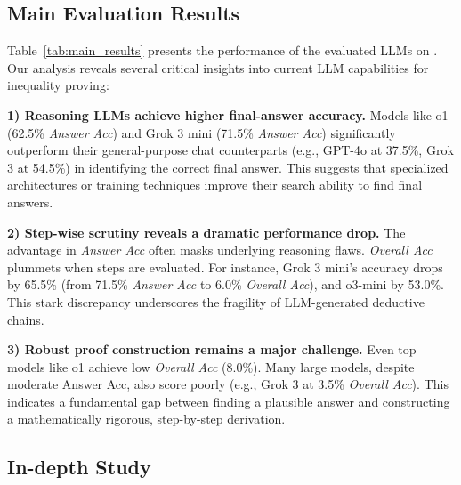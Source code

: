 \vspace{-2mm}
\subsection{Main Evaluation Results}
\label{sec:evaluation_results}
\vspace{-3mm}



Table~\ref{tab:main_results} presents the performance of the evaluated LLMs on \dataset. Our analysis reveals several critical insights into current LLM capabilities for inequality proving:
\vspace{-0.5mm}

\textbf{1) Reasoning LLMs achieve higher final-answer accuracy.} Models like o1 (62.5\% \textit{Answer Acc}) and Grok 3 mini (71.5\% \textit{Answer Acc}) significantly outperform their general-purpose chat counterparts (e.g., GPT-4o at 37.5\%, Grok 3 at 54.5\%) in identifying the correct final answer. This suggests that specialized architectures or training techniques improve their search ability to find final answers.

\vspace{-0.5mm}
\textbf{2) Step-wise scrutiny reveals a dramatic performance drop.} 
The advantage in \textit{Answer Acc} often masks underlying reasoning flaws. \textit{Overall Acc} plummets when steps are evaluated. For instance, Grok 3 mini's accuracy drops by 65.5\% (from 71.5\% \textit{Answer Acc} to 6.0\% \textit{Overall Acc}), and o3-mini by 53.0\%. This stark discrepancy underscores the fragility of LLM-generated deductive chains. 

\vspace{-0.5mm}
\textbf{3) Robust proof construction remains a major challenge.} Even top models like o1 achieve low \textit{Overall Acc} (8.0\%). Many large models, despite moderate Answer Acc, also score poorly (e.g., Grok 3 at 3.5\% \textit{Overall Acc}). This indicates a fundamental gap between finding a plausible answer and constructing a mathematically rigorous, step-by-step derivation.

\vspace{-3mm}
\subsection{In-depth Study}
\label{sec:in_depth_study}
\vspace{-2mm}

\vspace{-1mm}

